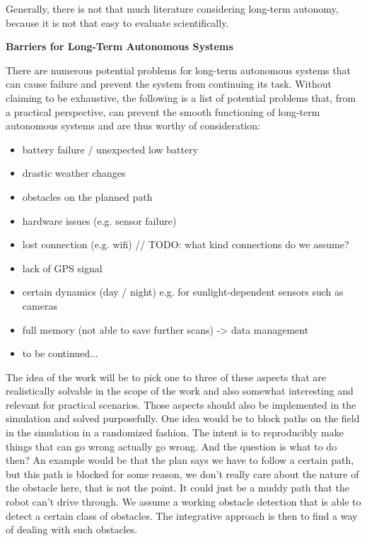 \documentclass[german, master, expose, latin1]{base/thesis_KBS}
\begin{document}
Generally, there is not that much literature considering long-term autonomy, because it is not that easy to evaluate scientifically.\newline

\pagebreak

\textbf{Barriers for Long-Term Autonomous Systems}\newline

There are numerous potential problems for long-term autonomous systems that can cause failure and prevent the system from continuing its task.
Without claiming to be exhaustive, the following is a list of potential problems that, from a practical perspective, can prevent the smooth functioning
of long-term autonomous systems and are thus worthy of consideration:
\begin{itemize}
    \item battery failure / unexpected low battery
    \item drastic weather changes
    \item obstacles on the planned path
    \item hardware issues (e.g. sensor failure)
    \item lost connection (e.g. wifi) // TODO: what kind connections do we assume?
    \item lack of GPS signal
    \item certain dynamics (day / night) e.g. for sunlight-dependent sensors such as cameras
    \item full memory (not able to save further scans) -> data management
    \item to be continued...
\end{itemize}

The idea of the work will be to pick one to three of these aspects that are realistically solvable in the scope of the work and also somewhat interesting and 
relevant for practical scenarios. Those aspects should also be implemented in the simulation and solved purposefully.
One idea would be to block paths on the field in the simulation in a randomized fashion. The intent is to reproducibly make things that can go wrong actually go wrong.
And the question is what to do then? An example would be that the plan says we have to follow a certain path, but this path is blocked for some reason, we don't really
care about the nature of the obstacle here, that is not the point. It could just be a muddy path that the robot can't drive through. We assume a working obstacle detection
that is able to detect a certain class of obstacles. The integrative approach is then to find a way of dealing with such obstacles.
\end{document}
